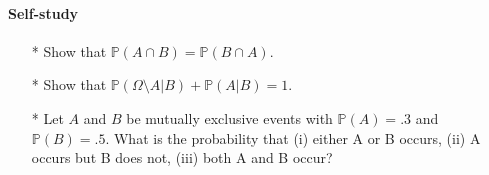 \documentclass{article}
\begin{document}
\paragraph{Self-study}
\begin{enumerate}
\item[*] Show that $\mathbb{P}(A \cap B) = \mathbb{P}(B \cap A)$.
\item[*] Show that $\mathbb{P}(\Omega \setminus A|B) + \mathbb{P}(A|B) = 1$.
\item[*] Let $A$ and $B$ be mutually exclusive events with $\mathbb{P}(A) = .3$ and $\mathbb{P}(B) = .5$. What is the probability that (i) either A or B occurs, (ii) A occurs but B does not, (iii) both A and B occur?
\end{enumerate}
\end{document}
